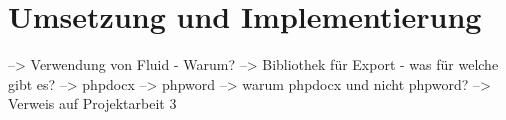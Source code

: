 \chapter{Umsetzung und Implementierung}\label{implementierung} 


--> Verwendung von Fluid - Warum?
--> Bibliothek für Export - was für welche gibt es?
    --> phpdocx
    --> phpword
    --> warum phpdocx und nicht phpword? --> Verweis auf Projektarbeit 3
    